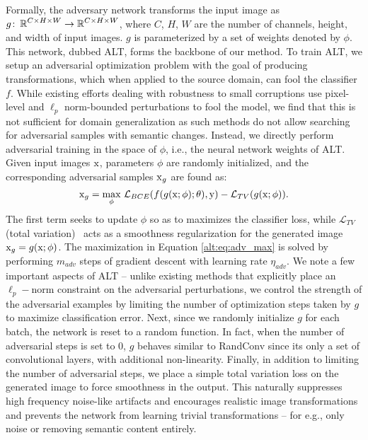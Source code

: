 Formally, the adversary network transforms the input image as $g\colon\operatorname{\mathbb{R}}^{C\times H\times W}\rightarrow\operatorname{\mathbb{R}}^{C\times H\times W}$, where $C$, $H$, $W$ are the number of channels, height, and width of input images.
$g$ is parameterized by a set of weights denoted by $\phi$. This network, dubbed ALT, forms the backbone of our method.  To train ALT, we setup an adversarial optimization problem with the goal of producing transformations, which when applied to the source domain, can fool the classifier $f$.
While existing efforts dealing with robustness to small corruptions use pixel-level and $\ell_p$ norm-bounded perturbations to fool the model, we find that this is not sufficient for domain generalization as such methods do not allow searching for adversarial samples with semantic changes.
Instead, we directly perform adversarial training in the space of $\phi$, i.e., the neural network weights of ALT. Given input images $\operatorname{\mathrm{x}}$, parameters $\phi$ are randomly initialized, and the corresponding adversarial samples $\operatorname{\mathrm{x}}_g$ are found as:
\begin{equation}
    \operatorname{\mathrm{x}}_g = \underset{\phi}{\textrm{max}}~\mathcal{L}_{BCE}(f(g(\operatorname{\mathrm{x}};\phi); \theta), \operatorname{\mathrm{y}}) - \mathcal{L}_{TV}(g(\operatorname{\mathrm{x}};\phi)). 
    \label{alt:eq:adv_max}
\end{equation}
The first term seeks to update $\phi$ so as to maximizes the classifier loss, while $\mathcal{L}_{TV}$ (total variation)~\citep{rudin1992nonlinear} acts as a smoothness regularization for the generated image $\operatorname{\mathrm{x}}_g = g(\operatorname{\mathrm{x}};\phi)$. The maximization in Equation \ref{alt:eq:adv_max} is solved by performing $m_{adv}$ steps of gradient descent with learning rate $\eta_{adv}$. We note a few important aspects of ALT -- unlike existing methods that explicitly place an $\ell_p-$norm constraint on the adversarial perturbations, we control the strength of the adversarial examples by limiting the number of optimization steps taken by $g$ to maximize classification error. Next, since we randomly initialize $g$ for each batch, the network is reset to a random function. In fact, when the number of adversarial steps is set to 0, $g$ behaves similar to RandConv \citep{xu2020robust} since its only a set of convolutional layers, with additional non-linearity. Finally, in addition to limiting the number of adversarial steps, we place a simple total variation loss on the generated image to force smoothness in the output. This naturally suppresses high frequency noise-like artifacts and encourages realistic image transformations and prevents the network from learning trivial transformations  -- for e.g., only noise or removing semantic content entirely. 


